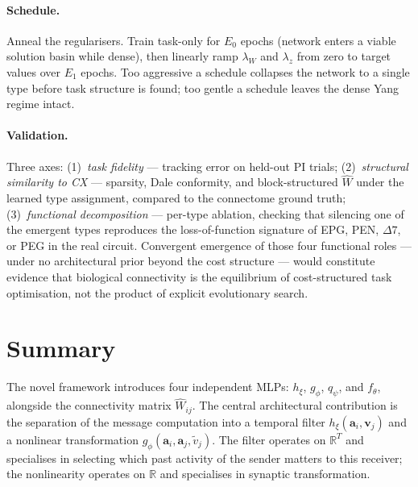 \documentclass[11pt]{article}
\begin{document}
\paragraph{Schedule.} Anneal the regularisers. Train task-only for
$E_0$ epochs (network enters a viable solution basin while dense),
then linearly ramp $\lambda_W$ and $\lambda_z$ from zero to target
values over $E_1$ epochs. Too aggressive a schedule collapses the
network to a single type before task structure is found; too gentle
a schedule leaves the dense Yang regime intact.

\paragraph{Validation.} Three axes: (1)~\emph{task fidelity} ---
tracking error on held-out PI trials; (2)~\emph{structural similarity
to CX} --- sparsity, Dale conformity, and block-structured $\hat{W}$
under the learned type assignment, compared to the connectome ground
truth; (3)~\emph{functional decomposition} --- per-type ablation,
checking that silencing one of the emergent types reproduces the
loss-of-function signature of EPG, PEN, $\Delta 7$, or PEG in the
real circuit. Convergent emergence of those four functional roles
--- under no architectural prior beyond the cost structure --- would
constitute evidence that biological connectivity is the equilibrium
of cost-structured task optimisation, not the product of explicit
evolutionary search.

\section{Summary}

The novel framework introduces four independent MLPs: $h_\xi$, $g_\phi$,
$q_\psi$, and $f_\theta$, alongside the connectivity matrix $\hat{W}_{ij}$.
The central architectural contribution is the separation of the message
computation into a temporal filter $h_\xi(\mathbf{a}_i, \mathbf{v}_j)$
and a nonlinear transformation $g_\phi(\mathbf{a}_i, \mathbf{a}_j,
\tilde{v}_j)$. The filter operates on $\mathbb{R}^T$ and specialises in
selecting which past activity of the sender matters to this receiver; the
nonlinearity operates on $\mathbb{R}$ and specialises in synaptic
transformation.
\end{document}
